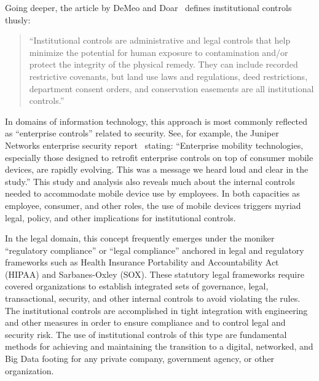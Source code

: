 Going deeper, the article by DeMeo and Doar~\cite{DeMeo2011} defines institutional controls thusly:
\begin{quote}
``Institutional controls are administrative and legal controls that help minimize the potential for human exposure to contamination and/or protect the integrity of the physical remedy. They can include recorded restrictive covenants, but land use laws and regulations, deed restrictions, department consent orders, and conservation easements are all institutional controls.''
\end{quote}

In domains of information technology, this approach is most commonly reflected as ``enterprise controls'' related to security.
See, for example, the Juniper Networks enterprise security report~\cite{Juniper2012} stating: ``Enterprise mobility technologies, especially those designed to retrofit enterprise controls on top of consumer mobile devices, are rapidly evolving. This was a message we heard loud and clear in the study.''
This study and analysis also reveals much about the internal controls needed to accommodate mobile device use by employees.
In both capacities as employee, consumer, and other roles, the use of mobile devices triggers myriad legal, policy, and other implications for institutional controls.

In the legal domain, this concept frequently emerges under the moniker ``regulatory compliance'' or ``legal compliance'' anchored in legal and regulatory frameworks such as Health Insurance Portability and Accountability Act (HIPAA) and Sarbanes-Oxley (SOX).
These statutory legal frameworks require covered organizations to establish integrated sets of governance, legal, transactional, security, and other internal controls to avoid violating the rules.
The institutional controls are accomplished in tight integration with engineering and other measures in order to ensure compliance and to control legal and security risk.
The use of institutional controls of this type are fundamental methods for achieving and maintaining the transition to a digital, networked, and Big Data footing for any private company, government agency, or other organization.

